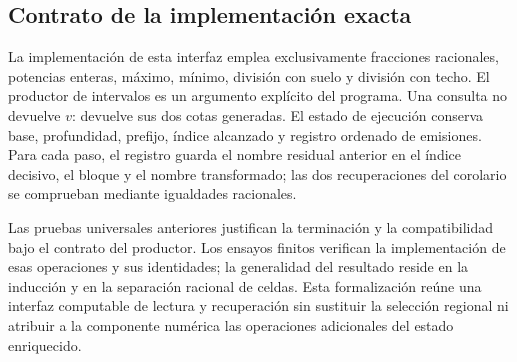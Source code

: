 \subsection{Contrato de la implementación exacta}
\label{subsec:residual-implementacion}

La implementación de esta interfaz emplea exclusivamente fracciones
racionales, potencias enteras, máximo, mínimo, división con suelo y división
con techo. El productor de intervalos es un argumento explícito del
programa. Una consulta no devuelve \(v\): devuelve sus dos cotas generadas.
El estado de ejecución conserva base, profundidad, prefijo, índice alcanzado
y registro ordenado de emisiones. Para cada paso, el registro guarda el
nombre residual anterior en el índice decisivo, el bloque y el nombre
transformado; las dos recuperaciones del corolario se comprueban mediante
igualdades racionales.

Las pruebas universales anteriores justifican la terminación y la
compatibilidad bajo el contrato del productor. Los ensayos finitos verifican
la implementación de esas operaciones y sus identidades; la generalidad
del resultado reside en la inducción y en la separación racional de celdas.
Esta formalización reúne una interfaz computable de lectura y recuperación
sin sustituir la selección regional ni atribuir a la componente numérica
las operaciones adicionales del estado enriquecido.
